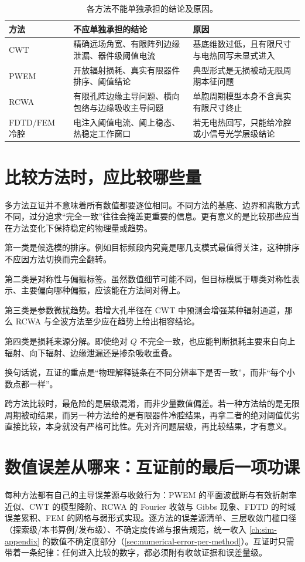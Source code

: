 \begin{table}[htbp]
  \centering
  \footnotesize
  \caption{各方法不能单独承担的结论及原因。}
  \label{tab:method_not_applicable}
  \begin{tabularx}{\textwidth}{@{}p{1.9cm}Y Y@{}}
    \toprule
    方法 & 不应单独承担的结论 & 原因 \\ \midrule
    CWT & 精确远场角宽、有限阵列边缘泄漏、器件级阈值电流 & 基底维数过低，且有限尺寸与电热回写未显式进入 \\
    PWEM & 开放辐射损耗、真实有限器件排序、阈值结论 & 典型形式是无损被动无限周期本征问题 \\
    RCWA & 有限孔阵边缘主导问题、横向包络与边缘吸收主导问题 & 单胞周期模型本身不含真实有限尺寸终止 \\
    FDTD/FEM 冷腔 & 电注入阈值电流、阈上稳态、热稳定工作窗口 & 若无电热回写，只能给冷腔或小信号光学层级结论 \\
    \bottomrule
  \end{tabularx}
\end{table}

\section{比较方法时，应比较哪些量}
多方法互证并不意味着所有数值都要逐位相同。不同方法的基底、边界和离散方式不同，过分追求“完全一致”往往会掩盖更重要的信息。更有意义的是比较那些应当在方法变化下保持稳定的物理量或趋势。

第一类是候选模的排序。例如目标频段内究竟是哪几支模式最值得关注，这种排序不应因方法切换而完全翻转。

第二类是对称性与偏振标签。虽然数值细节可能不同，但目标模属于哪类对称性表示、主要偏向哪种偏振，应该能在方法间对得上。

第三类是参数微扰趋势。若增大孔半径在 CWT 中预测会增强某种辐射通道，那么 RCWA 与全波方法至少应在趋势上给出相容结论。

第四类是损耗来源分解。即使绝对 $Q$ 不完全一致，也应能判断损耗主要来自向上辐射、向下辐射、边缘泄漏还是掺杂吸收重叠。

换句话说，互证的重点是“物理解释链条在不同分辨率下是否一致”，而非“每个小数点都一样”。

跨方法比较时，最危险的是层级混淆，而非少量数值偏差。若一种方法给的是无限周期被动结果，而另一种方法给的是有限器件冷腔结果，再拿二者的绝对阈值优劣直接比较，本身就没有严格可比性。先对齐问题层级，再比较结果，才有意义。

\section{数值误差从哪来：互证前的最后一项功课}
每种方法都有自己的主导误差源与收敛行为：PWEM 的平面波截断与有效折射率近似、CWT 的模型降阶、RCWA 的 Fourier 收敛与 Gibbs 现象、FDTD 的时域误差累积、FEM 的网格与弱形式实现。逐方法的误差源清单、三层收敛门槛口径（探索级/本书算例/发布级）、不确定度传递与报告规范，统一收入 \cref{ch:sim-appendix} 的数值不确定度部分（\cref{sec:numerical-error-per-method}）。互证时只需带着一条纪律：任何进入比较的数字，都必须附有收敛证据和误差量级。

